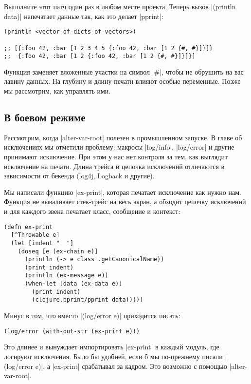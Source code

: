 Выполните этот патч один раз в любом месте проекта. Теперь вызов
\spverb|(println data)| напечатает данные так, как это делает \spverb|pprint|:

\begin{verbatim}
(println <vector-of-dicts-of-vectors>)

;; [{:foo 42, :bar [1 2 3 4 5 {:foo 42, :bar [1 2 {#, #}]}]}
;;  {:foo 42, :bar [1 2 {:foo 42, :bar [1 2 {#, #}]}]}]
\end{verbatim}

Функция заменяет вложенные участки на символ \spverb|#|, чтобы не обрушить на
вас лавину данных. На глубину и длину печати влияют особые переменные. Позже мы
рассмотрим, как управлять ими.

\subsection{В боевом режиме}


Рассмотрим, когда \spverb|alter-var-root| полезен в промышленном запуске. В
главе об исключениях мы отметили проблему: макросы \spverb|log/info|,
\spverb|log/error| и другие принимают исключение. При этом у нас нет контроля за
тем, как выглядит исключение на печати. Длина трейса и цепочка исключений
отличаются в зависимости от бекенда (log4j, Logback и другие).

Мы написали функцию \spverb|ex-print|, которая печатает исключение как нужно
нам. Функция не вываливает стек-трейс на весь экран, а обходит цепочку
исключений и для каждого звена печатает класс, сообщение и контекст:

\begin{verbatim}
(defn ex-print
  [^Throwable e]
  (let [indent "  "]
    (doseq [e (ex-chain e)]
      (println (-> e class .getCanonicalName))
      (print indent)
      (println (ex-message e))
      (when-let [data (ex-data e)]
        (print indent)
        (clojure.pprint/pprint data)))))
\end{verbatim}

\noindent
Минус в том, что вместо \spverb|(log/error e)| приходится писать:

\begin{verbatim}
(log/error (with-out-str (ex-print e)))
\end{verbatim}

Это длинее и вынуждает импортировать \spverb|ex-print| в каждый модуль, где
логируют исключения. Было бы удобней, если б мы по-прежнему писали
\spverb|(log/error e)|, а \spverb|ex-print| срабатывал за кадром. Это возможно с
помощью \spverb|alter-var-root|.

